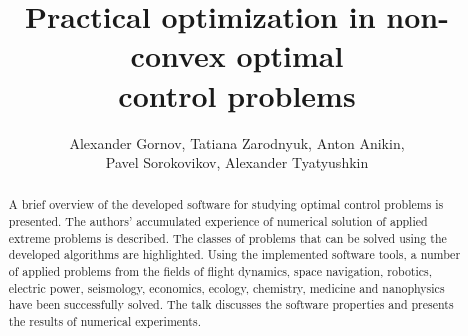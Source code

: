\begin{englishtitle} %
\title{Practical optimization in non-convex optimal\\ control problems}
\author{Alexander Gornov, Tatiana Zarodnyuk, Anton Anikin,\\ Pavel Sorokovikov, Alexander Tyatyushkin}

\maketitle

\begin{abstract}
A brief overview of the developed software for studying optimal control problems is presented. The authors' accumulated experience of numerical solution of applied extreme problems is described. The classes of problems that can be solved using the developed algorithms are highlighted. Using the implemented software tools, a number of applied problems from the fields of flight dynamics, space navigation, robotics, electric power, seismology, economics, ecology, chemistry, medicine and nanophysics have been successfully solved. The talk discusses the software properties and presents the results of numerical experiments.

\end{abstract}
\end{englishtitle}


\iffalse
%
%


\documentclass[12pt]{llncs}


\usepackage{iftex}

\ifPDFTeX
\usepackage[T2A]{fontenc}
\usepackage[utf8]{inputenc} %
\usepackage[english,russian]{babel}
\fi

